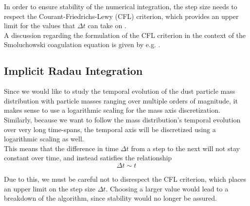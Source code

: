         In order to ensure stability of the numerical integration, the step size needs to respect 
        the Courant-Friedrichs-Lewy (CFL) criterion, which provides an upper limit for the values 
        that $\Delta t$ can take on \cite{courant_friedrichs_lewy_1928}. \\

        A discussion regarding the formulation of the CFL criterion in the context of the 
        Smoluchowski coagulation equation is given by e.g. \cite{laibe_lombart_2021}.
        

    \clearpage\subsection{Implicit Radau Integration }

        Since we would like to study the temporal evolution of the dust particle mass 
        distribution with particle masses ranging over multiple orders of magnitude, it makes 
        sense to use a logarithmic scaling for the mass axis discretization. \\

        Similarly, because we want to follow the mass distribution's temporal evolution
        over very long time-spans, the temporal axis will be discretized using a 
        logarithmic scaling as well. \\

        This means that the difference in time $\Delta t$ from a step to the next will not 
        stay constant over time, and instead satisfies the relationship 
        \begin{equation}
            \Delta t \sim t
        \end{equation}

        Due to this, we must be careful not to disrespect the CFL criterion, which places 
        an upper limit on the step size $\Delta t$. Choosing a larger value would lead to 
        a breakdown of the algorithm, since stability would no longer be assured. \\

